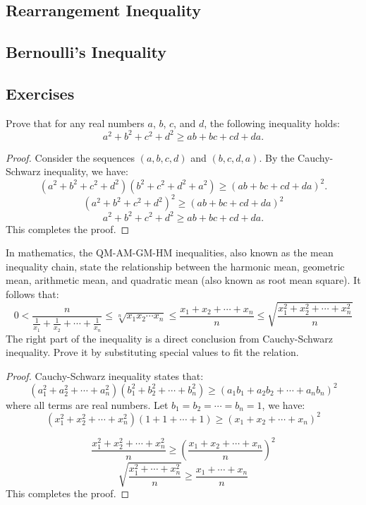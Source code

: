 \documentclass[
	12pt, %
	fleqn, %
	a4paper, %
]{LegrandOrangeBook}
\begin{document}
\subsection{Rearrangement Inequality}

\subsection{Bernoulli's Inequality}
\subsection{Exercises}
\begin{exercise}
    Prove that for any real numbers \( a \), \( b \), \( c \), and \( d \), the following inequality holds:
    \[
    a^2 + b^2 + c^2 + d^2 \geq ab + bc + cd + da.
    \]
\end{exercise}
\begin{proof}
    Consider the sequences \( (a, b, c, d) \) and \( (b, c, d, a) \). By the Cauchy-Schwarz inequality, we have:
    \[
    (a^2 + b^2 + c^2 + d^2)(b^2 + c^2 + d^2 + a^2) \geq (ab + bc + cd + da)^2.
    \]
    $$\left(a^2+b^2+c^2+d^2\right)^2 \geq (ab + bc + cd + da)^2$$
    \[
    a^2 + b^2 + c^2 + d^2 \geq ab + bc + cd + da.
    \]
    This completes the proof.
\end{proof}
\begin{exercise}
    In mathematics, the QM-AM-GM-HM inequalities, also known as the mean inequality chain, state the relationship between the harmonic mean, geometric mean, arithmetic mean, and quadratic mean (also known as root mean square).
    It follows that:
    \begin{equation}
        0<\frac{n}{\frac{1}{x_{1}}+\frac{1}{x_{2}}+\cdots+\frac{1}{x_{n}}} \leq \sqrt[n]{x_{1} x_{2} \cdots x_{n}} \leq \frac{x_{1}+x_{2}+\cdots+x_{n}}{n} \leq \sqrt{\frac{x_{1}^{2}+x_{2}^{2}+\cdots+x_{n}^{2}}{n}}
    \end{equation}
    The right part of the inequality is a direct conclusion from Cauchy-Schwarz inequality. Prove it by
    substituting special values to fit the relation.
\end{exercise}
\begin{proof}
    Cauchy-Schwarz inequality states that:
    $$\left(a_{1}^{2}+a_{2}^{2}+\cdots+a_{n}^{2}\right)\left(b_{1}^{2}+b_{2}^{2}+\cdots+b_{n}^{2}\right) \geq\left(a_{1} b_{1}+a_{2} b_{2}+\cdots+a_{n} b_{n}\right)^{2}$$
    where all terms are real numbers.
    Let $b_1=b_2=\cdots=b_n=1$, we have:
    $$\left(x_{1}^{2}+x_{2}^{2}+\cdots+x_{n}^{2}\right)(1+1+\cdots+1) \geq\left(x_{1}+x_{2}+\cdots+x_{n}\right)^{2}$$

    $$\frac{x_{1}^{2}+x_{2}^{2}+\cdots+x_{n}^{2}}{n} \geq\left(\frac{x_{1}+x_{2}+\cdots+x_{n}}{n}\right)^{2}$$
    $$\sqrt{\frac{x_{1}^{2}+\cdots+x_{n}^{2}}{n}} \geq \frac{x_{1}+\cdots+x_{n}}{n}$$
    This completes the proof.
\end{proof}
\end{document}
